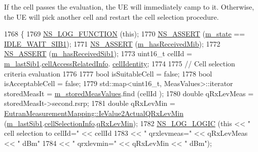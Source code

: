 If the cell passes the evaluation, the UE will immediately camp to it. Otherwise, the UE will pick another cell and restart the cell selection procedure. 
\begin{DoxyCode}
1768 \{
1769   \hyperlink{log-macros-disabled_8h_a90b90d5bad1f39cb1b64923ea94c0761}{NS\_LOG\_FUNCTION} (\textcolor{keyword}{this});
1770   \hyperlink{assert_8h_a6dccdb0de9b252f60088ce281c49d052}{NS\_ASSERT} (\hyperlink{classns3_1_1LteUeRrc_a81d711739d758a5add38b100086be632}{m\_state} == \hyperlink{classns3_1_1LteUeRrc_a241012c291e75681150c9214e11f6145a3e4976132b0f49dce2a4a31d97ee5073}{IDLE\_WAIT\_SIB1});
1771   \hyperlink{assert_8h_a6dccdb0de9b252f60088ce281c49d052}{NS\_ASSERT} (\hyperlink{classns3_1_1LteUeRrc_abcd8b45c6f3ad56f3459e274c79c035e}{m\_hasReceivedMib});
1772   \hyperlink{assert_8h_a6dccdb0de9b252f60088ce281c49d052}{NS\_ASSERT} (\hyperlink{classns3_1_1LteUeRrc_a040a3febc680272dee05806ac077ff4d}{m\_hasReceivedSib1});
1773   uint16\_t cellId = \hyperlink{classns3_1_1LteUeRrc_ad9ca8247270fbed524a86dff9bfd4999}{m\_lastSib1}.\hyperlink{structns3_1_1LteRrcSap_1_1SystemInformationBlockType1_af5ec0ff87a68ba57ee3dc77a4f878651}{cellAccessRelatedInfo}.
      \hyperlink{structns3_1_1LteRrcSap_1_1CellAccessRelatedInfo_a233b52bc592cfdddb1570c211a4f2126}{cellIdentity};
1774 
1775   \textcolor{comment}{// Cell selection criteria evaluation}
1776 
1777   \textcolor{keywordtype}{bool} isSuitableCell = \textcolor{keyword}{false};
1778   \textcolor{keywordtype}{bool} isAcceptableCell = \textcolor{keyword}{false};
1779   std::map<uint16\_t, MeasValues>::iterator storedMeasIt = \hyperlink{classns3_1_1LteUeRrc_a93094dcd5c235b2e2a8a299125100a57}{m\_storedMeasValues}.find (cellId
      );
1780   \textcolor{keywordtype}{double} qRxLevMeas = storedMeasIt->second.rsrp;
1781   \textcolor{keywordtype}{double} qRxLevMin = \hyperlink{classns3_1_1EutranMeasurementMapping_aa0e6f0265dccf1b6998658066ccb4ee0}{EutranMeasurementMapping::IeValue2ActualQRxLevMin}
       (\hyperlink{classns3_1_1LteUeRrc_ad9ca8247270fbed524a86dff9bfd4999}{m\_lastSib1}.\hyperlink{structns3_1_1LteRrcSap_1_1SystemInformationBlockType1_a6bfea3cb2d56cbd15ae5afbc13944f71}{cellSelectionInfo}.\hyperlink{structns3_1_1LteRrcSap_1_1CellSelectionInfo_a6827f809e7596ce3eb122d5cc7b5b881}{qRxLevMin});
1782   \hyperlink{group__logging_ga88acd260151caf2db9c0fc84997f45ce}{NS\_LOG\_LOGIC} (\textcolor{keyword}{this} << \textcolor{stringliteral}{" cell selection to cellId="} << cellId
1783                      << \textcolor{stringliteral}{" qrxlevmeas="} << qRxLevMeas << \textcolor{stringliteral}{" dBm"}
1784                      << \textcolor{stringliteral}{" qrxlevmin="} << qRxLevMin << \textcolor{stringliteral}{" dBm"});

\end{DoxyCode}

